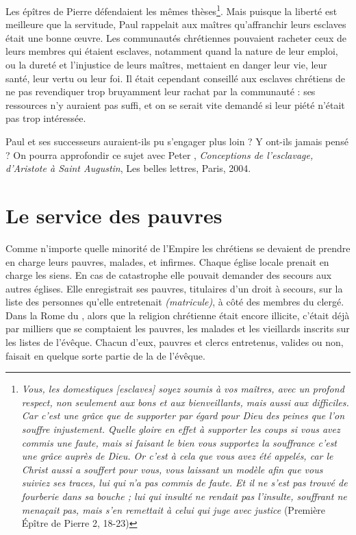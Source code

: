  Les épîtres de Pierre défendaient les mêmes thèses\footnote{\emph{Vous, les domestiques \emph{[esclaves]} soyez soumis à vos maîtres, avec un profond respect, non seulement aux bons et aux bienveillants, mais aussi aux difficiles. Car c'est une grâce que de supporter par égard pour Dieu des peines que l'on souffre injustement. Quelle gloire en effet à supporter les coups si vous avez commis une faute, mais si faisant le bien vous supportez la souffrance c'est une grâce auprès de Dieu. Or c'est à cela que vous avez été appelés, car le Christ aussi a souffert pour vous, vous laissant un modèle afin que vous suiviez ses traces, lui qui n'a pas commis de faute. Et il ne s'est pas trouvé de fourberie dans sa bouche ; lui qui insulté ne rendait pas l'insulte, souffrant ne menaçait pas, mais s'en remettait à celui qui juge avec justice} (Première Épître de Pierre 2, 18-23)}. Mais puisque la liberté est meilleure que la servitude, Paul rappelait aux maîtres qu'affranchir leurs esclaves était une bonne œuvre. Les communautés chrétiennes pouvaient racheter ceux de leurs membres qui étaient esclaves, notamment quand la nature de leur emploi, ou la dureté et l'injustice de leurs maîtres, mettaient en danger leur vie, leur santé, leur vertu ou leur foi. Il était cependant conseillé aux esclaves chrétiens de ne pas revendiquer trop bruyamment leur rachat par la communauté : ses ressources n'y auraient pas suffi, et on se serait vite demandé si leur piété n'était pas trop intéressée.

 Paul et ses successeurs auraient-ils pu s'engager plus loin ? Y ont-ils jamais pensé ?  On pourra approfondir ce sujet avec Peter , \emph{Conceptions de l'esclavage, d'Aristote à Saint Augustin}, Les belles lettres, Paris, 2004.



\section{Le service des pauvres}

 Comme n'importe quelle minorité de l'Empire les chrétiens se devaient de prendre en charge leurs pauvres, malades, et infirmes. Chaque église locale prenait en charge les siens. En cas de catastrophe elle pouvait demander des secours aux autres églises. Elle enregistrait ses pauvres, titulaires d'un droit à secours, sur la liste des personnes qu'elle entretenait \emph{(matricule)}, à côté des membres du clergé. Dans la Rome du , alors que la religion chrétienne était encore illicite, c'était déjà par milliers que se comptaient les pauvres, les malades et les vieillards inscrits sur les listes de l'évêque. Chacun d'eux, pauvres et clercs entretenus, valides ou non, faisait en quelque sorte partie de la  de l'évêque. 

